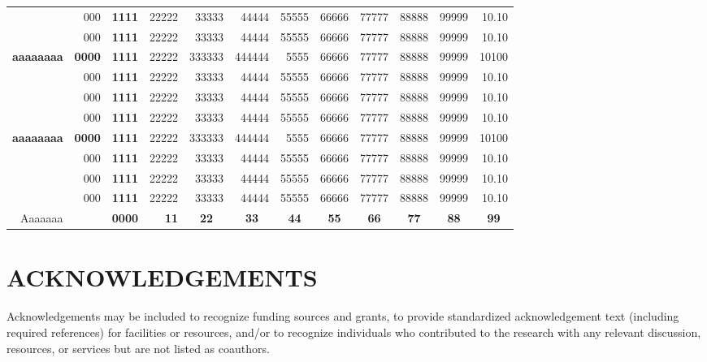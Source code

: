 \documentclass[9pt,article,twoside]{fapet-rho-class/fapet-rho}
\begin{document}
\begin{landscape}
\begin{table}[htbp]
\begin{tabular}{rrrrrrrrrrrr}
          & 000   & \textbf{1111} & 22222 & 33333 & 44444 & 55555  & 66666 & 77777 & 88888 & 99999 & 10.10 \\
          & 000   & \textbf{1111} & 22222 & 33333 & 44444 & 55555  & 66666 & 77777 & 88888 & 99999 & 10.10 \\
    \textbf{aaaaaaaa} & \textbf{0000} & \textbf{1111} & 22222 & 333333 & 444444 & 5555  & 66666 & 77777 & 88888 & 99999 & 10100 \\
          & 000   & \textbf{1111} & 22222 & 33333 & 44444 & 55555  & 66666 & 77777 & 88888 & 99999 & 10.10 \\
          & 000   & \textbf{1111} & 22222 & 33333 & 44444 & 55555  & 66666 & 77777 & 88888 & 99999 & 10.10 \\
          & 000   & \textbf{1111} & 22222 & 33333 & 44444 & 55555  & 66666 & 77777 & 88888 & 99999 & 10.10 \\
    \textbf{aaaaaaaa} & \textbf{0000} & \textbf{1111} & 22222 & 333333 & 444444 & 5555  & 66666 & 77777 & 88888 & 99999 & 10100 \\
          & 000   & \textbf{1111} & 22222 & 33333 & 44444 & 55555  & 66666 & 77777 & 88888 & 99999 & 10.10 \\
          & 000   & \textbf{1111} & 22222 & 33333 & 44444 & 55555  & 66666 & 77777 & 88888 & 99999 & 10.10 \\
          & 000   & \textbf{1111} & 22222 & 33333 & 44444 & 55555  & 66666 & 77777 & 88888 & 99999 & 10.10 \\
    \midrule
    Aaaaaaa &    & \textbf{0000} & \textbf{11} & \multicolumn{1}{c}{\textbf{22}} & \multicolumn{1}{c}{\textbf{33}} & \multicolumn{1}{c}{\textbf{44}} & \multicolumn{1}{c}{\textbf{55}} & \multicolumn{1}{c}{\textbf{66}} & \multicolumn{1}{c}{\textbf{77}} & \multicolumn{1}{c}{\textbf{88}} & \multicolumn{1}{c}{\textbf{99}} \\
    \bottomrule
    \end{tabular}%
  \label{tab:addlabel}%
\end{table}
\end{landscape}





\section{ACKNOWLEDGEMENTS}

Acknowledgements may be included to recognize funding sources and grants, to provide standardized acknowledgement text (including required references) for facilities or resources, and/or to recognize individuals who contributed to the research with any relevant discussion, resources, or services but are not listed as coauthors.
\end{document}
